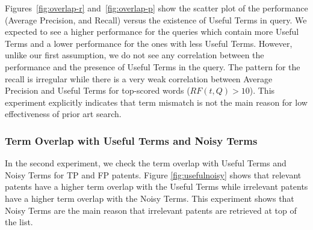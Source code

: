 Figures~\ref{fig:overlap-r} and~\ref{fig:overlap-p} show the scatter plot of the performance (Average Precision, and Recall) versus the existence of Useful Terms in query. 
We expected to see a higher performance for the queries which contain more Useful Terms and a lower performance for the ones with less Useful Terms. However, unlike our first assumption, we do not see any correlation between the performance and the presence of Useful Terms in the query. The pattern for the recall is irregular while there is a very weak correlation between Average Precision and Useful Terms for top-scored words ($RF(t, Q)>10$). This experiment explicitly indicates that term mismatch is not the main reason for low effectiveness of prior art search. 
\subsubsection{Term Overlap with Useful Terms and Noisy Terms}
In the second experiment, we check the term overlap with Useful Terms and Noisy Terms for TP and FP patents. Figure \ref{fig:usefulnoisy} shows that relevant patents have a higher term overlap with the Useful Terms while irrelevant patents have a higher term overlap with the Noisy Terms. This experiment shows that Noisy Terms are the main reason that irrelevant patents are retrieved at top of the list. 
